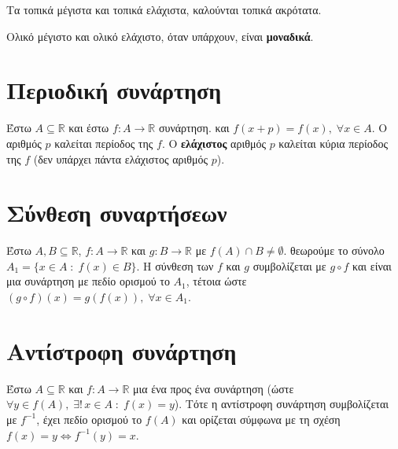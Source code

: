 \documentclass[a4paper,table]{report}
\begin{document}
\begin{rems}
\item {}
  \begin{myitemize}
    \item Τα τοπικά μέγιστα και τοπικά ελάχιστα, καλούνται \textcolor{Col1}{τοπικά
      ακρότατα}.
    \item Ολικό μέγιστο και ολικό ελάχιστο, όταν υπάρχουν, είναι \textbf{μοναδικά}.
  \end{myitemize}
\end{rems}

\section{Περιοδική συνάρτηση}

\begin{dfn}
  Έστω $ A \subseteq \mathbb{R} $ και έστω $ f \colon A \to \mathbb{R} $ συνάρτηση. 
  και $ f(x+p) = f(x), \; \forall x \in A $. Ο αριθμός $ p $ καλείται
  \textcolor{Col1}{περίοδος} της $f$. 
  Ο \textbf{ελάχιστος} αριθμός $ p $ καλείται \textcolor{Col1}{κύρια περίοδος} της $f$ (δεν υπάρχει πάντα
  ελάχιστος αριθμός $p$). 
\end{dfn}

\section{Σύνθεση συναρτήσεων}

Έστω $ A, B \subseteq \mathbb{R} $, $ f \colon A \to \mathbb{R} $ και $ g \colon
B \to \mathbb{R} $ με $ f(A) \cap B \neq \emptyset $. θεωρούμε το σύνολο $ A_{1} = \{
x \in A \; : \; f(x) \in B \} $. Η σύνθεση των $f$ και $g$ συμβολίζεται με $ g \circ f $
και είναι μια συνάρτηση με πεδίο ορισμού το $ A_{1} $, τέτοια ώστε $ (g \circ f)(x) = 
g(f(x)), \; \forall x \in A_{1} $.

\section{Αντίστροφη συνάρτηση}

\begin{dfn}
  Έστω $ A \subseteq \mathbb{R} $ και $ f \colon A \to \mathbb{R} $ μια ένα προς ένα 
  συνάρτηση (ώστε $ \forall y \in f(A), \; \exists! \, x \in A \; : \; f(x)=y $). Τότε
  η αντίστροφη συνάρτηση συμβολίζεται με $ f^{-1} $, έχει πεδίο ορισμού το $ f(A) $ 
  και ορίζεται σύμφωνα με τη σχέση $ f(x)=y \Leftrightarrow f^{-1}(y)=x $.
\end{dfn}
\end{document}
